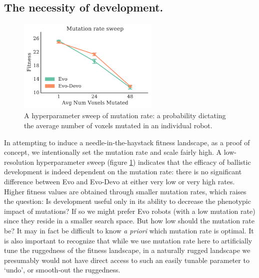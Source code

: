 


\subsection*{The necessity of development.}

\begin{figure}
\centering
\includegraphics[width=0.6\textwidth]{Chapter03/img/sweep_gecco}
\caption{\label{fig:hyperparam_sweep} A hyperparameter sweep of mutation rate: a probability dictating the average number of voxels mutated in an individual robot.}
\end{figure}


In attempting to induce a needle-in-the-haystack fitness landscape, as a proof of concept, we intentionally set the mutation rate and scale fairly high.
A low-resolution hyperparameter sweep (figure \ref{fig:hyperparam_sweep}) indicates that the efficacy of ballistic development is indeed dependent on the mutation rate: there is no significant difference between Evo and Evo-Devo at either very low or very high rates. 
Higher fitness values are obtained through smaller mutation rates, which raises the question: Is development useful only in its ability to decrease the phenotypic impact of mutations?
If so we might prefer Evo robots (with a low mutation rate) since they reside in a smaller search space. 
But how low should the mutation rate be? 
It may in fact be difficult to know \textit{a priori} which mutation rate is optimal.
It is also important to recognize that while we use mutation rate here to artificially tune the ruggedness of the fitness landscape, in a naturally rugged landscape we presumably would not have direct access to such an easily tunable parameter to `undo', or smooth-out the ruggedness.


